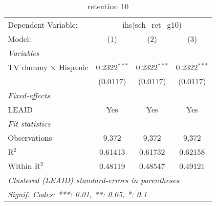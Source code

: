\begin{table}[htbp]
\centering
\caption{retention 10}
\begin{tabular}{lccc}
\tabularnewline\midrule\midrule
Dependent Variable:&\multicolumn{3}{c}{ihs(sch\_ret\_g10)}\\
Model:&(1) & (2) & (3)\\
\midrule \emph{Variables}&   &   &  \\
TV dummy $\times$ Hispanic & 0.2322$^{***}$ & 0.2322$^{***}$ & 0.2322$^{***}$\\
  &(0.0117) & (0.0117) & (0.0117)\\
\midrule \emph{Fixed-effects}&   &   &  \\
LEAID & Yes & Yes & Yes\\
\midrule \emph{Fit statistics}&  & & \\
Observations & 9,372&9,372&9,372\\
R$^2$ & 0.61413&0.61732&0.62158\\
Within R$^2$ & 0.48119&0.48547&0.49121\\
\midrule\midrule\multicolumn{4}{l}{\emph{Clustered (LEAID) standard-errors in parentheses}}\\
\multicolumn{4}{l}{\emph{Signif. Codes: ***: 0.01, **: 0.05, *: 0.1}}\\
\end{tabular}
\end{table}

